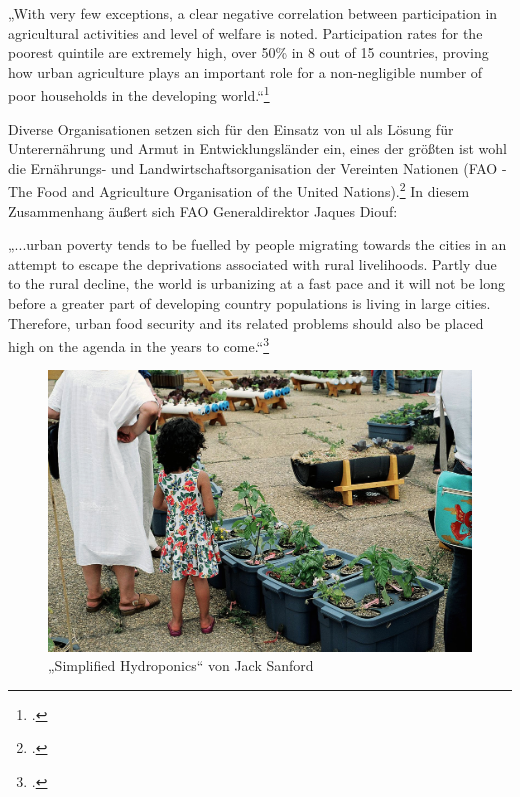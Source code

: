 \documentclass{scrartcl}
\begin{document}
\begin{displayquote}
„With very few exceptions, a clear negative correlation between participation in agricultural activities and level of welfare is noted. Participation rates for the poorest quintile are extremely high, over 50\% in 8 out of 15 countries, proving how urban agriculture plays an important role for a non-negligible number of poor households in the developing world.“\footcite[S.268]{Zezza2010UrbanCountries}
\end{displayquote}

Diverse Organisationen setzen sich für den Einsatz von \acs{ul} als Lösung für Unterernährung und Armut in Entwicklungsländer ein, eines der größten ist wohl die Ernährungs- und Landwirtschaftsorganisation der Vereinten Nationen (FAO - The Food and Agriculture Organisation of the United Nations).\footcite[Vgl.][S.6ff]{FAOAboutNations} In diesem Zusammenhang äußert sich FAO Generaldirektor Jaques Diouf:

\begin{displayquote}
„\lbrack...\rbrack urban poverty tends to be fuelled by people migrating towards the cities in an attempt to escape the deprivations associated with rural livelihoods. Partly due to the rural decline, the world is urbanizing at a fast pace and it will not be long before a greater part of developing country populations is living in large cities. Therefore, urban food security and its related problems should also be placed high on the agenda in the years to come.“\footcite[S.5f]{FoodandAgricultureOrganizationoftheUnitedNations2006The2006}
\end{displayquote}


\begin{figure}[htbp]
    \centering
    \includegraphics[width=14cm]{image_folder/simplified_hydroponics_jack_sanford.jpg}
  \caption{„Simplified Hydroponics“ von Jack Sanford}
  \label{fig:shydroponics}
\end{figure} 
\end{document}
